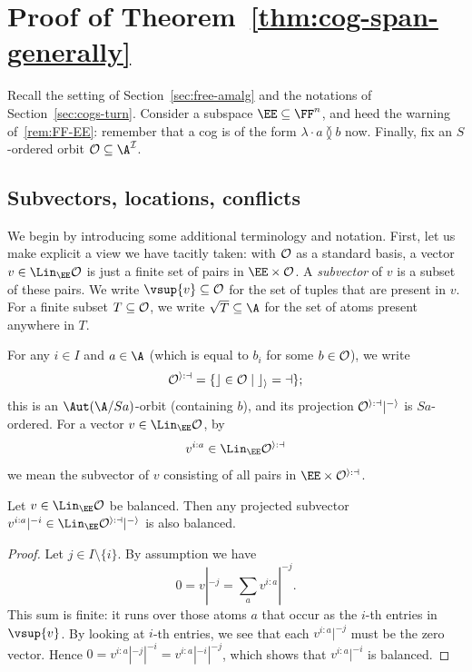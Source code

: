 \section{Proof of Theorem~\ref{thm:cog-span-generally}}\label{sec:appendix-cogs}
Recall the setting of Section~\ref{sec:free-amalg} and the notations of Section~\ref{sec:cogs-turn}.
Consider a subspace $\EE \subseteq \FF^n$, and heed the warning of~\ref{rem:FF-EE}:
remember that a cog is of the form $\lambda \cdot a \between b$ now.
Finally, fix an $S$-ordered orbit $\cal O \subseteq \A^I$.

\subsection{Subvectors, locations, conflicts}
We begin by introducing some additional terminology and notation. 
First, let us make explicit a view we have tacitly taken:
with $\cal O$ as a standard basis, a vector $v \in \Lin_\EE \cal O$ is just a finite set of pairs in $\EE \times \cal O$.
A \emph{subvector} of $v$ is a subset of these pairs. 
We write $\vsup{v}\subseteq {\cal O}$ for the set of tuples that are present in $v$. 
For a finite subset $T\subseteq\cal O$, we write $\sqrt T\subseteq\A$ for the set of atoms present anywhere in $T$.

For any $i \in I$ and $a \in \A$ (which is equal to $b_i$ for some $b \in \cal O$), we write 
\[
    \cal O^{i:a} = \{c \in \cal O \mid c_i = a\};
\]
this is an $\Aut(\A / S a)$-orbit (containing $b$), and its projection $\cal O^{i:a} |^{-i}$ is $Sa$-ordered.
For a vector $v \in \Lin_\EE \cal O$, by
\[
    v^{i:a} \in \Lin_\EE \cal O^{i:a}
\]
we mean the subvector of $v$ consisting of all pairs in $\EE \times \cal O^{i:a}$.

\begin{lemma}\label{lem:balanced-projected-subvector}
    Let $v \in \Lin_\EE \cal O$ be balanced. 
    Then any projected subvector $v^{i:a}|^{-i} \in \Lin_\EE \cal O^{i:a}|^{-i}$ is also balanced.
\end{lemma}
\begin{proof}
    Let $j \in I \setminus \{i\}$. 
    By assumption we have \[
        0 = v|^{-j} = \sum_a v^{i:a}|^{-j}.
    \]
    This sum is finite: it runs over those atoms $a$ that occur as the $i$-th entries in $\vsup{v}$.
    By looking at $i$-th entries, we see that each $v^{i:a}|^{-j}$ must be the zero vector.
    Hence $0 = v^{i:a}|^{-j}|^{-i} = v^{i:a}|^{-i}|^{-j}$,
    which shows that $v^{i:a}|^{-i}$ is balanced.
\end{proof}

